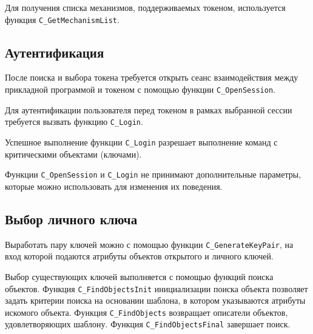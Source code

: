 Для получения списка механизмов, поддерживаемых токеном,
используется функция \verb|C_GetMechanismList|.


\subsection{Аутентификация}

После поиска и выбора токена требуется открыть сеанс
взаимодействия между прикладной программой и токеном с
помощью функции \verb|C_OpenSession|.

Для аутентификации пользователя перед токеном в рамках
выбранной сессии требуется вызвать функцию \verb|C_Login|.

Успешное выполнение функции \verb|C_Login| разрешает
выполнение команд с критическими объектами (ключами).

Функции \verb|C_OpenSession| и \verb|C_Login| не принимают
дополнительные параметры, которые можно использовать для
изменения их поведения.


\subsection{Выбор личного ключа}

Выработать пару ключей можно с помощью функции
\verb|C_GenerateKeyPair|, на вход которой подаются атрибуты
объектов открытого и личного ключей.

Выбор существующих ключей выполняется с помощью функций
поиска объектов. Функция \verb|C_FindObjectsInit| инициализации
поиска объекта позволяет задать критерии поиска на основании
шаблона, в котором указываются атрибуты искомого объекта.
Функция \verb|C_FindObjects| возвращает описатели объектов,
удовлетворяющих шаблону. Функция \verb|C_FindObjectsFinal|
завершает поиск.

